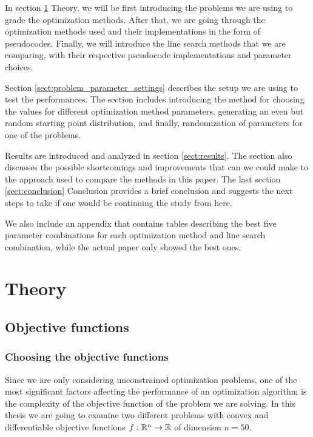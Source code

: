 \documentclass[english, 12pt, a4paper, sci, utf8, a-1b, online, table]{aaltothesis}
\newcommand{\R}{\ensuremath\mathbb{R}}
\begin{document}
In section \ref{sect:theory} Theory, we will be first introducing the problems we are using to grade the optimization methods. After that, we are going through the optimization methods used and their implementations in the form of pseudocodes. Finally, we will introduce the line search methods that we are comparing, with their respective pseudocode implementations and parameter choices.

Section \ref{sect:problem_parameter_settings} describes the setup we are using to test the performances. The section includes introducing the method for choosing the values for different optimization method parameters, generating an even but random starting point distribution, and finally, randomization of parameters for one of the problems.

Results are introduced and analyzed in section \ref{sect:results}. The section also discusses the possible shortcomings and improvements that can we could make to the approach used to compare the methods in this paper. The last section \ref{sect:conclusion} Conclusion provides a brief conclusion and suggests the next steps to take if one would be continuing the study from here.

We also include an appendix that contains tables describing the best five parameter combinations for each optimization method and line search combination, while the actual paper only showed the best ones.


\section{Theory}
\label{sect:theory}


\subsection{Objective functions}


\subsubsection{Choosing the objective functions}


Since we are only considering unconstrained optimization problems, one of the most significant factors affecting the performance of an optimization algorithm is the complexity of the objective function of the problem we are solving. 
In this thesis we are going to examine two different problems with convex and differentiable objective functions $f : \R^n \rightarrow \R$ of dimension $n = 50$. 
\end{document}

